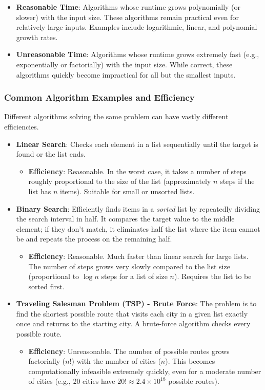\documentclass[11pt,oneside]{book}
\begin{document}
\begin{itemize}
    \item \textbf{Reasonable Time}: Algorithms whose runtime grows polynomially (or slower) with the input size. These algorithms remain practical even for relatively large inputs. Examples include logarithmic, linear, and polynomial growth rates.
    \item \textbf{Unreasonable Time}: Algorithms whose runtime grows extremely fast (e.g., exponentially or factorially) with the input size. While correct, these algorithms quickly become impractical for all but the smallest inputs.
\end{itemize}

\subsubsection*{Common Algorithm Examples and Efficiency}
Different algorithms solving the same problem can have vastly different efficiencies.

\begin{itemize}
    \item \textbf{Linear Search}: Checks each element in a list sequentially until the target is found or the list ends.
        \begin{itemize}
            \item \textbf{Efficiency}: Reasonable. In the worst case, it takes a number of steps roughly proportional to the size of the list (approximately $n$ steps if the list has $n$ items). Suitable for small or unsorted lists.
        \end{itemize}
    \item \textbf{Binary Search}: Efficiently finds items in a \textit{sorted} list by repeatedly dividing the search interval in half. It compares the target value to the middle element; if they don't match, it eliminates half the list where the item cannot be and repeats the process on the remaining half.
        \begin{itemize}
            \item \textbf{Efficiency}: Reasonable. Much faster than linear search for large lists. The number of steps grows very slowly compared to the list size (proportional to $\log n$ steps for a list of size $n$). Requires the list to be sorted first.
        \end{itemize}
    \item \textbf{Traveling Salesman Problem (TSP) - Brute Force}: The problem is to find the shortest possible route that visits each city in a given list exactly once and returns to the starting city. A brute-force algorithm checks every possible route.
        \begin{itemize}
            \item \textbf{Efficiency}: Unreasonable. The number of possible routes grows factorially ($n!$) with the number of cities ($n$). This becomes computationally infeasible extremely quickly, even for a moderate number of cities (e.g., 20 cities have $20! \approx 2.4 \times 10^{18}$ possible routes).
        \end{itemize}
\end{itemize}
\end{document}

